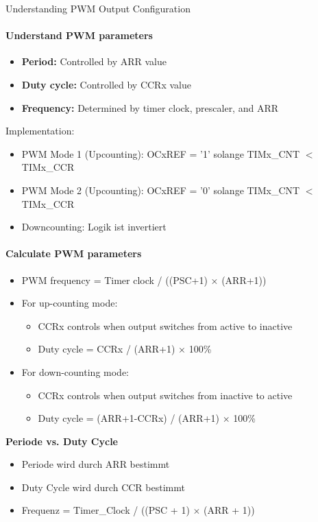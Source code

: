 \begin{concept}{Understanding PWM Output Configuration}
\paragraph{Understand PWM parameters}
\begin{itemize}
    \item \textbf{Period:} Controlled by ARR value
    \item \textbf{Duty cycle:} Controlled by CCRx value
    \item \textbf{Frequency:} Determined by timer clock, prescaler, and ARR
\end{itemize}
Implementation:
\begin{itemize}
        \item PWM Mode 1 (Upcounting): OCxREF = '1' solange TIMx\_CNT $<$ TIMx\_CCR
        \item PWM Mode 2 (Upcounting): OCxREF = '0' solange TIMx\_CNT $<$ TIMx\_CCR
        \item Downcounting: Logik ist invertiert
    \end{itemize}

\paragraph{Calculate PWM parameters}
\begin{itemize}
    \item PWM frequency = Timer clock / ((PSC+1) × (ARR+1))
    \item For up-counting mode:
    \begin{itemize}
        \item CCRx controls when output switches from active to inactive
        \item Duty cycle = CCRx / (ARR+1) × 100\%
    \end{itemize}
    \item For down-counting mode:
    \begin{itemize}
        \item CCRx controls when output switches from inactive to active
        \item Duty cycle = (ARR+1-CCRx) / (ARR+1) × 100\%
    \end{itemize}
\end{itemize}

\textbf{Periode vs. Duty Cycle}
    \begin{itemize}
        \item Periode wird durch ARR bestimmt
        \item Duty Cycle wird durch CCR bestimmt
        \item Frequenz = Timer\_Clock / ((PSC + 1) $\times$ (ARR + 1))
    \end{itemize}


\end{concept}
